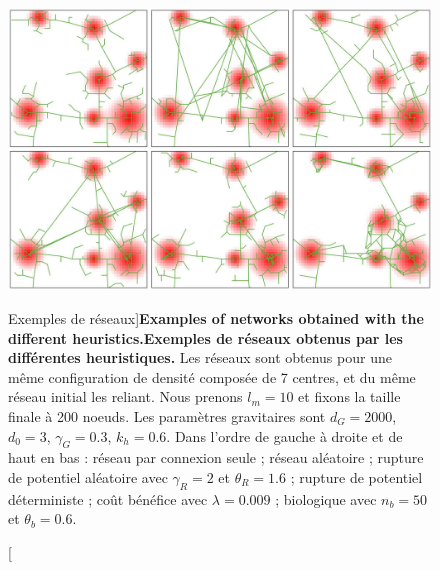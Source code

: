 \begin{figure}
	\includegraphics[width=\linewidth]{Figures/Final/7-1-2-fig-networkgrowth-examples.jpg}
\caption[Network examples][Exemples de réseaux]{\textbf{Examples of networks obtained with the different heuristics.}\label{fig:networkgrowth:examples}}{\textbf{Exemples de réseaux obtenus par les différentes heuristiques.} Les réseaux sont obtenus pour une même configuration de densité composée de 7 centres, et du même réseau initial les reliant. Nous prenons $l_m = 10$ et fixons la taille finale à 200 noeuds. Les paramètres gravitaires sont $d_G = 2000$, $d_0 = 3$, $\gamma_G = 0.3$, $k_h = 0.6$. Dans l'ordre de gauche à droite et de haut en bas : réseau par connexion seule ; réseau aléatoire ; rupture de potentiel aléatoire avec $\gamma_R = 2$ et $\theta_R = 1.6$ ; rupture de potentiel déterministe ; coût bénéfice avec $\lambda = 0.009$ ; biologique avec $n_b = 50$ et $\theta_b = 0.6$.\label{fig:networkgrowth:examples}}
\end{figure}




